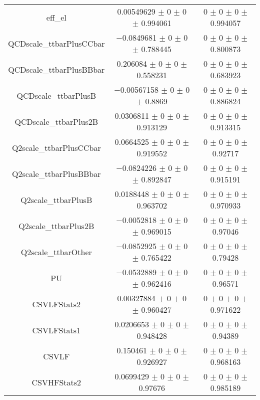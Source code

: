 \begin{table}
\begin{tabular}{ccc}
eff\_el & \num{0.00549629} $\pm$ \num{0} $\pm$ \num{0} $\pm$ \num{0.994061} & \num{0} $\pm$ \num{0} $\pm$ \num{0} $\pm$ \num{0.994057}\\
QCDscale\_ttbarPlusCCbar & \num{-0.0849681} $\pm$ \num{0} $\pm$ \num{0} $\pm$ \num{0.788445} & \num{0} $\pm$ \num{0} $\pm$ \num{0} $\pm$ \num{0.800873}\\
QCDscale\_ttbarPlusBBbar & \num{0.206084} $\pm$ \num{0} $\pm$ \num{0} $\pm$ \num{0.558231} & \num{0} $\pm$ \num{0} $\pm$ \num{0} $\pm$ \num{0.683923}\\
QCDscale\_ttbarPlusB & \num{-0.00567158} $\pm$ \num{0} $\pm$ \num{0} $\pm$ \num{0.8869} & \num{0} $\pm$ \num{0} $\pm$ \num{0} $\pm$ \num{0.886824}\\
QCDscale\_ttbarPlus2B & \num{0.0306811} $\pm$ \num{0} $\pm$ \num{0} $\pm$ \num{0.913129} & \num{0} $\pm$ \num{0} $\pm$ \num{0} $\pm$ \num{0.913315}\\
Q2scale\_ttbarPlusCCbar & \num{0.0664525} $\pm$ \num{0} $\pm$ \num{0} $\pm$ \num{0.919552} & \num{0} $\pm$ \num{0} $\pm$ \num{0} $\pm$ \num{0.92717}\\
Q2scale\_ttbarPlusBBbar & \num{-0.0824226} $\pm$ \num{0} $\pm$ \num{0} $\pm$ \num{0.892847} & \num{0} $\pm$ \num{0} $\pm$ \num{0} $\pm$ \num{0.915191}\\
Q2scale\_ttbarPlusB & \num{0.0188448} $\pm$ \num{0} $\pm$ \num{0} $\pm$ \num{0.963702} & \num{0} $\pm$ \num{0} $\pm$ \num{0} $\pm$ \num{0.970933}\\
Q2scale\_ttbarPlus2B & \num{-0.0052818} $\pm$ \num{0} $\pm$ \num{0} $\pm$ \num{0.969015} & \num{0} $\pm$ \num{0} $\pm$ \num{0} $\pm$ \num{0.97046}\\
Q2scale\_ttbarOther & \num{-0.0852925} $\pm$ \num{0} $\pm$ \num{0} $\pm$ \num{0.765422} & \num{0} $\pm$ \num{0} $\pm$ \num{0} $\pm$ \num{0.79428}\\
PU & \num{-0.0532889} $\pm$ \num{0} $\pm$ \num{0} $\pm$ \num{0.962416} & \num{0} $\pm$ \num{0} $\pm$ \num{0} $\pm$ \num{0.96571}\\
CSVLFStats2 & \num{0.00327884} $\pm$ \num{0} $\pm$ \num{0} $\pm$ \num{0.960427} & \num{0} $\pm$ \num{0} $\pm$ \num{0} $\pm$ \num{0.971622}\\
CSVLFStats1 & \num{0.0206653} $\pm$ \num{0} $\pm$ \num{0} $\pm$ \num{0.948428} & \num{0} $\pm$ \num{0} $\pm$ \num{0} $\pm$ \num{0.94389}\\
CSVLF & \num{0.150461} $\pm$ \num{0} $\pm$ \num{0} $\pm$ \num{0.926927} & \num{0} $\pm$ \num{0} $\pm$ \num{0} $\pm$ \num{0.968163}\\
CSVHFStats2 & \num{0.0699429} $\pm$ \num{0} $\pm$ \num{0} $\pm$ \num{0.97676} & \num{0} $\pm$ \num{0} $\pm$ \num{0} $\pm$ \num{0.985189}\\

\end{tabular}
\end{table}
